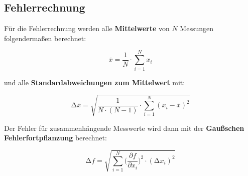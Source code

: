 

\subsection{Fehlerrechnung}
Für die Fehlerrechnung werden alle \textbf{Mittelwerte} von $N$ Messungen
folgendermaßen berechnet:

\begin{equation}
	\overline{x} = \frac{1}{N} \cdot \sum_{i=1}^N x_i
	\label{eqn:Mittelwert}
\end{equation}

und alle \textbf{Standardabweichungen zum Mittelwert} mit:

\begin{equation}
	\increment\overline{x} = \sqrt{\frac{1}{N\cdot(N-1)}\cdot\sum_{i=1}^N (x_i-\overline{x})^2}
	\label{eqn:St_Mittelwert}
\end{equation}

Der Fehler für zusammenhängende Messwerte wird dann mit der \textbf{Gaußschen
	Fehlerfortpflanzung} berechnet:

\begin{equation}
	\increment{f} = \sqrt{ \sum_{i = 1}^{N}  \biggl(\frac{\partial{f}}{\partial{x_i}}\biggr)^2\cdot(\increment{x_i})^2}
	\label{eqn:Gauss}
\end{equation}

